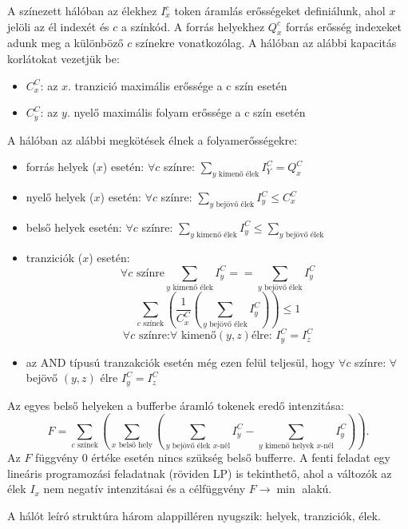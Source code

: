 A színezett hálóban az élekhez $I^c_x$ token áramlás erősségeket definiálunk, ahol $x$ jelöli az él indexét és $c$ a színkód. A forrás helyekhez $Q^c_x$ forrás erősség indexeket adunk meg a különböző $c$ színekre vonatkozólag. A hálóban az alábbi kapacitás korlátokat vezetjük be:
\begin{itemize}
\item $C^C_x$: az $x$. tranzició maximális erőssége a c szín esetén 
\item $C^C_y$: az $y$. nyelő maximális folyam erőssége a c szín esetén
\end{itemize}
A hálóban az alábbi megkötések élnek a folyamerősségekre:
\begin{itemize}
\item forrás helyek ($x$) esetén: $\forall c$ színre: $\sum_{y\text{ kimenő élek}}I^C_Y = Q^C_x$
\item nyelő helyek ($x$) esetén: $\forall c$ színre: $\sum_{y\text{ bejövő élek}}I^C_y \leq C^C_x$
\item belső helyek esetén: $\forall c$ színre: $\sum_{y\text{ kimenő élek}} I^C_y \leq \sum_{y\text{ bejövő élek}}$
\item tranziciók ($x$) esetén:
$$\forall c \text{ színre} \sum_{y\text{ kimenő élek}} I^C_y == \sum_{y\text{ bejövő élek}} I^C_y $$
$$\sum_{c \text{ színek}}\left( \frac{1}{C^C_x} \left( \sum_{y \text{ bejövő élek}} I^C_y \right) \right) \leq 1$$
$$\forall c \text{ színre:} \forall \text{ kimenő} (y,z) \text{élre: } I^C_y=I^C_z$$
\item az AND típusú tranzakciók esetén még ezen felül teljesül, hogy 	$\forall c$ színre: $\forall$ bejövő $(y,z)$ élre $I^C_y=I^C_z$
\end{itemize}
Az egyes belső helyeken a bufferbe áramló tokenek  eredő intenzitása:
$$F=\sum_{c\text{ színek}} \left( \sum_{x\text{ belső hely}}\left( \sum_{y\text{ bejövő élek }x\text{-nél}}I^C_y - \sum_{y \text{ kimenő helyek }x\text{-nél}} I^C_y \right) \right).$$
Az $F$ függvény 0 értéke esetén nincs szükség belső bufferre. 
A fenti feladat egy lineáris programozási feladatnak (röviden LP) is tekinthető, ahol a változók az élek $I_x$ nem negatív intenzitásai és a célfüggvény $F \rightarrow \min$ alakú. 
\newpage
{}

A hálót leíró struktúra három alappilléren nyugszik: helyek, tranziciók, élek.

